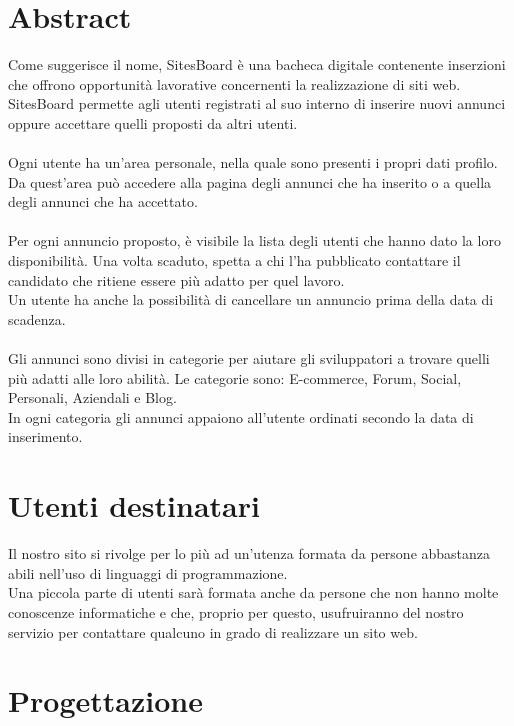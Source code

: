 \documentclass[12pt]{article}
\begin{document}
\section{Abstract}
Come suggerisce il nome, SitesBoard è una bacheca digitale contenente inserzioni che offrono opportunità lavorative concernenti la realizzazione di siti web.\\
SitesBoard permette agli utenti registrati al suo interno di inserire nuovi annunci oppure accettare quelli proposti da altri utenti.\\\\
Ogni utente ha un’area personale, nella quale sono presenti i propri dati profilo.\\
Da quest’area può accedere alla pagina degli annunci che ha inserito o a quella degli annunci che ha accettato.\\\\
Per ogni annuncio proposto, è visibile la lista degli utenti che hanno dato la loro disponibilità. Una volta scaduto, spetta a chi l’ha pubblicato contattare il candidato che ritiene essere più adatto per quel lavoro.\\
Un utente ha anche la possibilità di cancellare un annuncio prima della data di scadenza.\\\\
Gli annunci sono divisi in categorie per aiutare gli sviluppatori a trovare quelli più adatti alle loro abilità. Le categorie sono: E-commerce, Forum, Social, Personali, Aziendali e Blog.\\
In ogni categoria gli annunci appaiono all’utente ordinati secondo la data di inserimento.\\


\section{Utenti destinatari}
Il nostro sito si rivolge per lo più ad un’utenza formata da persone abbastanza abili nell’uso di linguaggi di programmazione. \\
Una piccola parte di utenti sarà formata anche da persone che non hanno molte conoscenze informatiche e che, proprio per questo, usufruiranno del nostro servizio per contattare qualcuno in grado di realizzare un sito web.
\newpage

\section{Progettazione}
\end{document}
